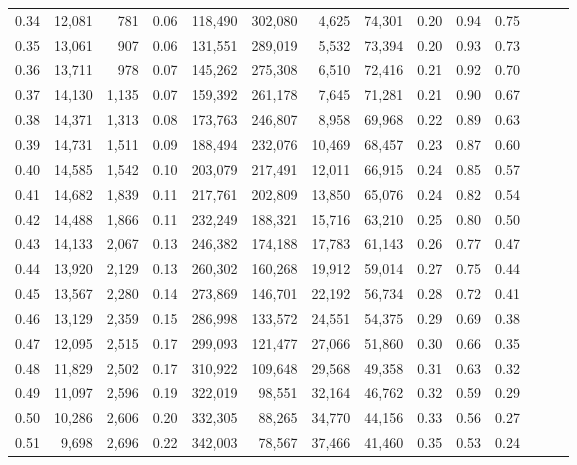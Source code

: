 \begin{tabular}{rrrrrrrrrrrrrr}
0.34 &  12,081 &    781 &  0.06 &  118,490 &  302,080 &   4,625 &  74,301 &  0.20 &  0.94 &      0.75 \\
0.35 &  13,061 &    907 &  0.06 &  131,551 &  289,019 &   5,532 &  73,394 &  0.20 &  0.93 &      0.73 \\
0.36 &  13,711 &    978 &  0.07 &  145,262 &  275,308 &   6,510 &  72,416 &  0.21 &  0.92 &      0.70 \\
0.37 &  14,130 &  1,135 &  0.07 &  159,392 &  261,178 &   7,645 &  71,281 &  0.21 &  0.90 &      0.67 \\
0.38 &  14,371 &  1,313 &  0.08 &  173,763 &  246,807 &   8,958 &  69,968 &  0.22 &  0.89 &      0.63 \\
0.39 &  14,731 &  1,511 &  0.09 &  188,494 &  232,076 &  10,469 &  68,457 &  0.23 &  0.87 &      0.60 \\
0.40 &  14,585 &  1,542 &  0.10 &  203,079 &  217,491 &  12,011 &  66,915 &  0.24 &  0.85 &      0.57 \\
0.41 &  14,682 &  1,839 &  0.11 &  217,761 &  202,809 &  13,850 &  65,076 &  0.24 &  0.82 &      0.54 \\
0.42 &  14,488 &  1,866 &  0.11 &  232,249 &  188,321 &  15,716 &  63,210 &  0.25 &  0.80 &      0.50 \\
0.43 &  14,133 &  2,067 &  0.13 &  246,382 &  174,188 &  17,783 &  61,143 &  0.26 &  0.77 &      0.47 \\
0.44 &  13,920 &  2,129 &  0.13 &  260,302 &  160,268 &  19,912 &  59,014 &  0.27 &  0.75 &      0.44 \\
0.45 &  13,567 &  2,280 &  0.14 &  273,869 &  146,701 &  22,192 &  56,734 &  0.28 &  0.72 &      0.41 \\
0.46 &  13,129 &  2,359 &  0.15 &  286,998 &  133,572 &  24,551 &  54,375 &  0.29 &  0.69 &      0.38 \\
0.47 &  12,095 &  2,515 &  0.17 &  299,093 &  121,477 &  27,066 &  51,860 &  0.30 &  0.66 &      0.35 \\
0.48 &  11,829 &  2,502 &  0.17 &  310,922 &  109,648 &  29,568 &  49,358 &  0.31 &  0.63 &      0.32 \\
0.49 &  11,097 &  2,596 &  0.19 &  322,019 &   98,551 &  32,164 &  46,762 &  0.32 &  0.59 &      0.29 \\
0.50 &  10,286 &  2,606 &  0.20 &  332,305 &   88,265 &  34,770 &  44,156 &  0.33 &  0.56 &      0.27 \\
0.51 &   9,698 &  2,696 &  0.22 &  342,003 &   78,567 &  37,466 &  41,460 &  0.35 &  0.53 &      0.24 \\

\end{tabular}
